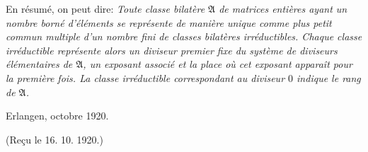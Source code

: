 En résumé, on peut dire: \emph{Toute classe bilatère $\mathfrak A$ de matrices entières ayant un nombre borné d'éléments se représente de manière unique comme plus petit commun multiple d'un nombre fini de classes bilatères irréductibles. Chaque classe irréductible représente alors un diviseur premier fixe du système de diviseurs élémentaires de $\mathfrak A$, un exposant associé et la place où cet exposant apparaît pour la première fois. La classe irréductible correspondant au diviseur $0$ indique le rang de $\mathfrak A$.}

\begin{flushleft}
Erlangen, octobre 1920.
\end{flushleft}
\begin{center}
(Reçu le 16. 10. 1920.)
\end{center}
